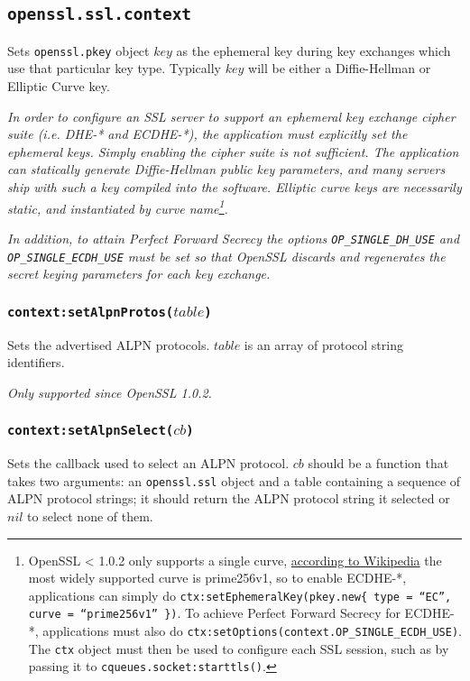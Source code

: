 \documentclass[11pt, oneside]{memoir}
\newcommand*{\fn}[1]{\texttt{#1}\xspace}
\newcommand*{\module}[1]{\texttt{#1}\xspace}
\newcounter{toccols}
\newenvironment{Module}[1]{
	\subsection{\texttt{#1}}
	\addtocontents{toc}{
		\protect\begin{multicols}{\value{toccols}}
	}
}{
	\addtocontents{toc}{\protect\end{multicols}}
}
\begin{document}
\begin{Module}{openssl.ssl.context}
Sets \module{openssl.pkey} object $key$ as the ephemeral key during key exchanges which use that particular key type. Typically $key$ will be either a Diffie-Hellman or Elliptic Curve key.

\emph{In order to configure an SSL server to support an ephemeral key exchange cipher suite (i.e. DHE-* and ECDHE-*), the application must explicitly set the ephemeral keys. Simply enabling the cipher suite is not sufficient. The application can statically generate Diffie-Hellman public key parameters, and many servers ship with such a key compiled into the software. Elliptic curve keys are necessarily static, and instantiated by curve name\footnote{OpenSSL < 1.0.2 only supports a single curve, \href{http://en.wikipedia.org/w/index.php?title=Comparison\_of\_TLS\_implementations&oldid=629779090\#Supported\_elliptic\_curves}{according to Wikipedia} the most widely supported curve is prime256v1, so to enable ECDHE-*, applications can simply do \texttt{ctx:setEphemeralKey(pkey.new\{ type = ``EC'', curve = ``prime256v1'' \})}. To achieve Perfect Forward Secrecy for ECDHE-*, applications must also do \texttt{ctx:setOptions(context.OP\_SINGLE\_ECDH\_USE)}. The \texttt{ctx} object must then be used to configure each SSL session, such as by passing it to \fn{cqueues.socket:starttls()}.}.}

\emph{In addition, to attain Perfect Forward Secrecy the options \texttt{OP\_SINGLE\_DH\_USE} and \texttt{OP\_SINGLE\_ECDH\_USE} must be set so that OpenSSL discards and regenerates the secret keying parameters for each key exchange.}

\subsubsection[\fn{context:setAlpnProtos}]{\fn{context:setAlpnProtos($table$)}}

Sets the advertised ALPN protocols. $table$ is an array of protocol string identifiers.

\emph{Only supported since OpenSSL 1.0.2.}

\subsubsection[\fn{context:setAlpnSelect}]{\fn{context:setAlpnSelect($cb$)}}

Sets the callback used to select an ALPN protocol. $cb$ should be a function that takes two arguments: an \module{openssl.ssl} object and a table containing a sequence of ALPN protocol strings; it should return the ALPN protocol string it selected or $nil$ to select none of them.


\end{Module}
\end{document}
